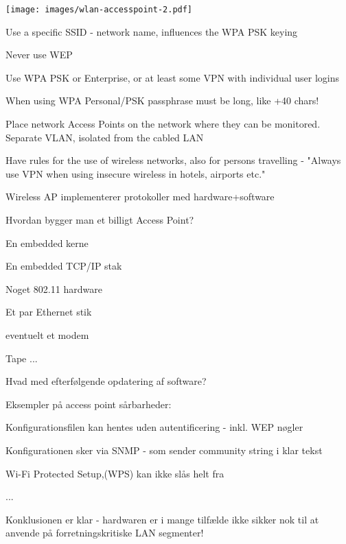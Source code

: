\documentclass[Screen16to9,17pt]{foils}
\begin{document}
\begin{minipage}{10cm}
\texttt{[image: images/wlan-accesspoint-2.pdf]}
\end{minipage}
\begin{minipage}{\linewidth-10cm}
\begin{list2}
\item Use a specific SSID - network name, influences the WPA PSK keying
\item Never use WEP
\item Use WPA PSK or Enterprise, or at least some VPN with individual user logins

\item When using WPA Personal/PSK passphrase must be long, like +40 chars!
\item Place network Access Points on the network where they can be monitored. Separate VLAN, isolated from the cabled LAN
\item Have rules for the use of wireless networks, also for persons travelling - "Always use VPN when using insecure wireless in hotels, airports etc."
\end{list2}
\end{minipage}



\centerline{Wireless AP implementerer protokoller med hardware+software}

\begin{list1}
\item Hvordan bygger man et billigt Access Point?
\begin{list2}
\item En embedded kerne
\item En embedded TCP/IP stak
\item Noget 802.11 hardware
\item Et par Ethernet stik
\item eventuelt et modem
\item Tape ...
\end{list2}
\item Hvad med efterfølgende opdatering af software?
\end{list1}

\begin{list1}
\item Eksempler på access point sårbarheder:
\item Konfigurationsfilen kan hentes uden autentificering - inkl. WEP
  nøgler
\item Konfigurationen sker via SNMP - som sender community string i
  klar tekst
\item  Wi-Fi Protected Setup,(WPS) kan ikke slås helt fra
\item ...
\item Konklusionen er klar - hardwaren er i mange tilfælde ikke sikker
  nok til at anvende på forretningskritiske LAN segmenter!
\end{list1}


\slidenext
\end{document}
